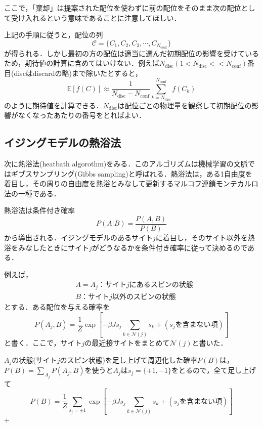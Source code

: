 \documentclass[a4paper,11pt]{jsarticle}
\begin{document}
ここで，「棄却」は提案された配位を使わずに前の配位をそのまま次の配位として受け入れるという意味であることに注意してほしい．\par
上記の手順に従うと，配位の列
\begin{equation}
  \mathcal{C} = \{ C_1,C_2,C_3,\cdots,C_{N_{\text{conf}}} \}
\end{equation}
が得られる．しかし最初の方の配位は適当に選んだ初期配位の影響を受けているため，期待値の計算に含めてはいけない．例えば$N_{\text{disc}}(1<N_{\text{disc}}<<N_{\text{conf}})$番目(discはdiscardの略)まで除いたとすると，
\begin{equation}
  \mathbb{E}[f(C)] \approx \frac{1}{N_{\text{disc}} - N_{\text{conf}}}\sum_{k=N_{\text{disc}}}^{N_{\text{conf}}}f(C_k)
\end{equation}
のように期待値を計算できる．$N_{\text{disc}}$は配位ごとの物理量を観察して初期配位の影響がなくなったあたりの番号をとればよい．

\subsection*{イジングモデルの熱浴法}
次に熱浴法(heatbath algorothm)をみる．このアルゴリズムは機械学習の文脈ではギブスサンプリング(Gibbs sampling)と呼ばれる．熱浴法は，ある1自由度を着目し，その周りの自由度を熱浴とみなして更新するマルコフ連鎖モンテカルロ法の一種である．\par
熱浴法は条件付き確率
\begin{equation}
  P(A|B) = \frac{P(A,B)}{P(B)}
\end{equation}
から導出される．イジングモデルのあるサイト$j$に着目し，そのサイト以外を熱浴をみなしたときにサイト$j$がどうなるかを条件付き確率に従って決めるのである．\par
例えば，
\begin{align}
  & A = A_j \text{：サイト$j$にあるスピンの状態} \\
  & B \text{：サイト$j$以外のスピンの状態}
\end{align}
とする．ある配位を与える確率を
\begin{equation}
  P(A_j,B) = \frac{1}{Z}\exp{\left[ -\beta J s_j \sum_{k\in \mathcal{N}(j)} s_k + (s_j\text{を含まない項}) \right]}
\end{equation}
と書く．ここで，サイト$j$の最近接サイトをまとめて$\mathcal{N}(j)$と書いた．\par
$A_j$の状態(サイト$j$のスピン状態)を足し上げて周辺化した確率$P(B)$は，$P(B)=\sum_{A_j}P(A_j,B)$を使うと$A_j$は$s_j=\{+1,-1\}$をとるので，全て足し上げて
\begin{equation}
  P(B) = \frac{1}{Z}\sum_{s_j=\pm 1}\exp{\left[ -\beta J s_j \sum_{k\in \mathcal{N}(j)} s_k + (s_j\text{を含まない項}) \right]}
\end{equation}
+
\end{document}
